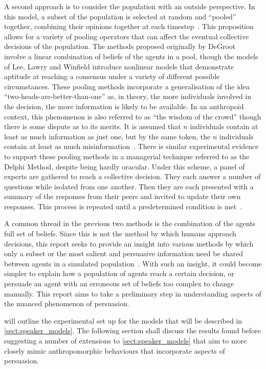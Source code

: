A second approach is to consider the population with an outside perspective. In this model, a subset of the population is selected at random and ``pooled'' together, combining their opinions together at each timestep~\cite{Degroot1974ReachingConsensus, Lee2018CombiningConsensus}. This proposition allows for a variety of pooling operators that can affect the eventual collective decisions of the population. The methods proposed originally by DeGroot~\cite{Degroot1974ReachingConsensus} involve a linear combination of beliefs of the agents in a pool, though the models of Lee, Lawry and Winfield introduce nonlinear models that demonstrate aptitude at reaching a consensus under a variety of different possible circumstances. These pooling methods incorporate a generalisation of the idea ``two-heads-are-better-than-one'' as, in theory, the more individuals involved in the decision, the more information is likely to be available. In an anthropoid context, this phenomenon is also referred to as ``the wisdom of the crowd'' though there is some dispute as to its merits. It is assumed that $n$ individuals contain at least as much information as just one, but by the same token, the $n$ individuals contain at least as much misinformation~\cite{Dalkey1963AnExperts}. There is similar experimental evidence to support these pooling methods in a managerial technique referred to as the Delphi Method, despite being hardly oracular. Under this scheme, a panel of experts are gathered to reach a collective decision. They each answer a number of questions while isolated from one another. Then they are each presented with a summary of the responses from their peers and invited to update their own responses. This process is repeated until a predetermined condition is met~\cite{Dalkey1963AnExperts}. 

A common thread in the previous two methods is the combination of the agents full set of beliefs. Since this is not the method by which humans approach decisions, this report seeks to provide an insight into various methods by which only a subset or the most salient and persuasive information need be shared between agents in a simulated population~\cite{Harvey2019QuantitativeMarking}. With such an insight, it could become simpler to explain how a population of agents reach a certain decision, or persuade an agent with an erroneous set of beliefs too complex to change manually. This report aims to take a preliminary step in understanding aspects of the nuanced phenomenon of persuasion.

 will outline the experimental set up for the models that will be described in \cref{sect:speaker_models}. The following section shall discuss the results found before suggesting a number of extensions to \cref{sect:speaker_models} that aim to more closely mimic anthropomorphic behaviours that incorporate aspects of persuasion. 


